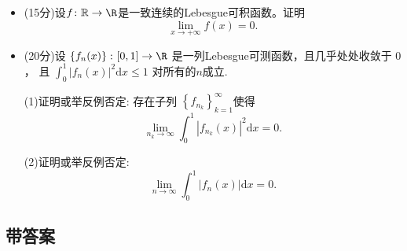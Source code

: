\begin{itemize}
\item[五、] (15分)设$f\colon\mathbb{R}\rightarrow\R$是一致连续的Lebesgue可积函数。证明
$$\lim_{x \rightarrow+\infty} f(x)=0.$$

\item[六、](20分)设 $\left\{f_n(x)\right\}\colon[0,1]\rightarrow\R$
是一列Lebesgue可测函数，且几乎处处收敛于 $0$，
且 $\int_0^1 |f_n(x)|^2 \mathrm{d}x \leq 1$ 对所有的$n$成立.

(1)证明或举反例否定: 存在子列 $\left\{f_{n_k}\right\}_{k=1}^{\infty}$使得
$$\lim_{n_k \rightarrow \infty} \int_0^1 |f_{n_k}(x)|^2 \mathrm{d}x=0.$$

(2)证明或举反例否定:
$$\lim_{n \rightarrow \infty} \int_0^1 |f_n(x)| \mathrm{d}x=0.$$

\end{itemize}

\subsection{带答案}


